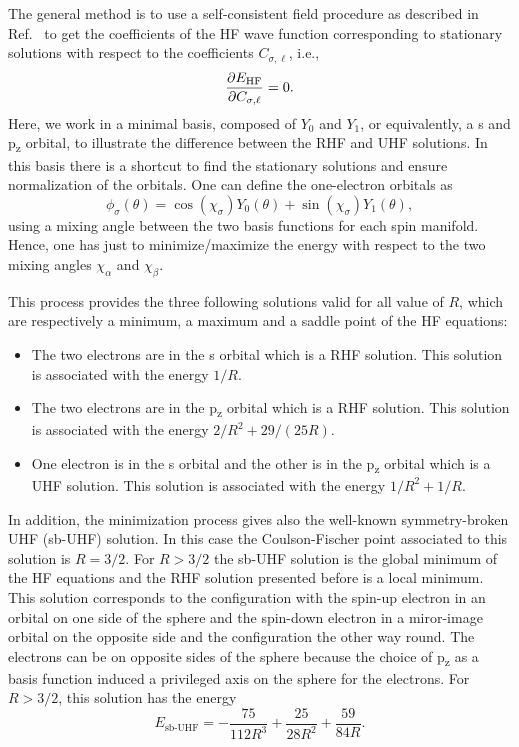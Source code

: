 \documentclass[11pt,a4paper]{article}
\begin{document}
The general method is to use a self-consistent field procedure as described in Ref.~\cite{SzaboBook} to get the coefficients of the HF wave function corresponding to stationary solutions with respect to the coefficients $C_{\sigma,\ell}$, i.e.,
\begin{equation}
	\pdv{E_{\text{HF}}}{C_{\sigma,\ell}} = 0.
\end{equation}
Here, we work in a minimal basis, composed of $Y_{0}$ and $Y_{1}$, or equivalently, a s and p\textsubscript{z} orbital, to illustrate the difference between the RHF and UHF solutions. In this basis there is a shortcut to find the stationary solutions and ensure normalization of the orbitals. One can define the one-electron orbitals as
\begin{equation}
	\phi_\sigma(\theta)= \cos(\chi_\sigma)Y_{0}(\theta) + \sin(\chi_\sigma)Y_{1}(\theta),
\end{equation}
using a mixing angle between the two basis functions for each spin manifold. 
Hence, one has just to minimize/maximize the energy with respect to the two mixing angles $\chi_\alpha$ and $\chi_\beta$.
 
This process provides the three following solutions valid for all value of $R$, which are respectively a minimum, a maximum and a saddle point of the HF equations:
\begin{itemize}
\item The two electrons are in the s orbital which is a RHF solution. This solution is associated with the energy $1/R$.
\item The two electrons are in the p\textsubscript{z} orbital which is a RHF solution. This solution is associated with the energy $2/R^{2}+ 29/(25R)$.
\item One electron is in the s orbital and the other is in the p\textsubscript{z} orbital which is a UHF solution. This solution is associated with the energy $1/R^{2} + 1/R$.
\end{itemize}

In addition, the minimization process gives also the well-known symmetry-broken UHF (sb-UHF) solution. In this case the Coulson-Fischer point associated to this solution is $R=3/2$. For $R>3/2$ the sb-UHF solution is the global minimum of the HF equations and the RHF solution presented before is a local minimum. This solution corresponds to the configuration with the spin-up electron in an orbital on one side of the sphere and the spin-down electron in a miror-image orbital on the opposite side and the configuration the other way round. The electrons can be on opposite sides of the sphere because the choice of p\textsubscript{z} as a basis function induced a privileged axis on the sphere for the electrons. For $R>3/2$, this solution has the energy
\begin{equation}\label{eq:EsbUHF}
	E_{\text{sb-UHF}}=-\frac{75}{112R^3}+\frac{25}{28R^2}+\frac{59}{84R}.
\end{equation}
\end{document}
